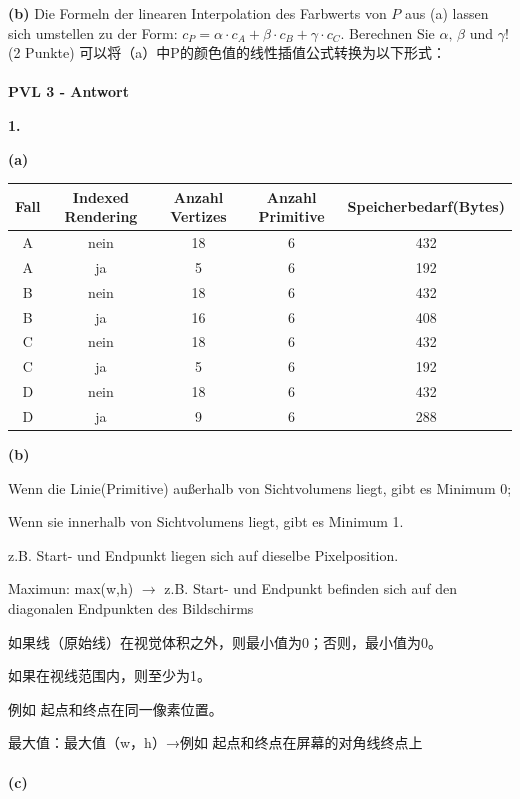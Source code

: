\documentclass[fleqn]{article}
\begin{document}
\indent\textbf{(b)} Die Formeln der linearen Interpolation des Farbwerts von $P$ aus (a) lassen sich umstellen zu der Form:
$c_P=\alpha\cdot c_A+\beta\cdot c_B+\gamma\cdot c_C$. Berechnen Sie $\alpha,\,\beta$ und $\gamma$! (2 Punkte)
可以将（a）中P的颜色值的线性插值公式转换为以下形式：
\\
\\
\noindent\textbf{PVL 3 - Antwort}

\indent\textbf{1.}

\indent\indent\textbf{(a)}

\begin{center}
    \begin{tabular}{|c|c|c|c|c|}
        \hline
        Fall&Indexed Rendering&Anzahl Vertizes&Anzahl Primitive&Speicherbedarf(Bytes)\\
        \hline
        A&nein&18&6&432\\
        \hline
        A&ja&5&6&192\\
        \hline
        B&nein&18&6&432\\
        \hline
        B&ja&16&6&408\\
        \hline
        C&nein&18&6&432\\
        \hline
        C&ja&5&6&192\\
        \hline
        D&nein&18&6&432\\
        \hline
        D&ja&9&6&288\\
        \hline
    \end{tabular}
\end{center}

\indent\indent\textbf{(b)}

Wenn die Linie(Primitive) außerhalb von Sichtvolumens liegt, gibt es Minimum 0; 

Wenn sie innerhalb von Sichtvolumens liegt, gibt es Minimum 1. 

z.B. Start- und Endpunkt liegen sich auf dieselbe Pixelposition. 

Maximun: max(w,h) $\rightarrow$ z.B. Start- und Endpunkt befinden sich auf den diagonalen Endpunkten des Bildschirms

如果线（原始线）在视觉体积之外，则最小值为0；否则，最小值为0。

如果在视线范围内，则至少为1。

例如 起点和终点在同一像素位置。

最大值：最大值（w，h）→例如 起点和终点在屏幕的对角线终点上
\\
\\
\indent\indent\textbf{(c)}
\end{document}
